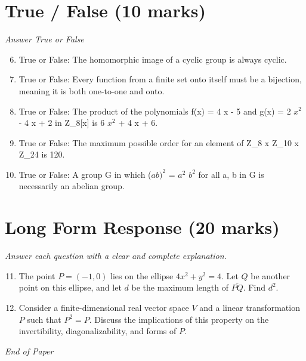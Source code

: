 \documentclass[12pt]{article}
\begin{document}
\section*{True / False (10 marks)}
\textit{Answer True or False}
\begin{enumerate}[label=\arabic*.]
\setcounter{enumi}{5}
\item True or False: The homomorphic image of a cyclic group is always cyclic.
\item True or False: Every function from a finite set onto itself must be a bijection, meaning it is both one-to-one and onto.
\item True or False: The product of the polynomials f(x) = 4 x - 5 and g(x) = 2 $x^2$ - 4 x + 2 in Z\_8[x] is 6 $x^2$ + 4 x + 6.
\item True or False: The maximum possible order for an element of Z\_8 x Z\_10 x Z\_24 is 120.
\item True or False: A group G in which ($ab)^2$ = $a^2$ $b^2$ for all a, b in G is necessarily an abelian group.
\end{enumerate}

\section*{Long Form Response (20 marks)}
\textit{Answer each question with a clear and complete explanation.}
\begin{enumerate}[label=\arabic*.]
\setcounter{enumi}{10}
\item The point $P = (-1,0)$ lies on the ellipse $4 x^2 + y^2 = 4.$ Let $Q$ be another point on this ellipse, and let $d$ be the maximum length of $\overline{PQ}.$ Find $d^2.$
\item Consider a finite-dimensional real vector space \( V \) and a linear transformation \( P \) such that \( P^2 = P \). Discuss the implications of this property on the invertibility, diagonalizability, and forms of \( P \).
\end{enumerate}

\vfill
\noindent\textit{End of Paper}
\end{document}
